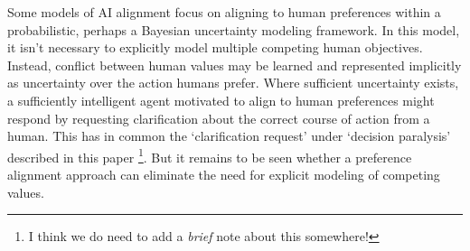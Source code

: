 Some models of AI alignment focus on \cite{russell2019human} aligning to human preferences within a probabilistic, perhaps a Bayesian uncertainty modeling framework.  In this model, it isn't necessary to explicitly model multiple competing human objectives. Instead, conflict between human values may be learned and represented implicitly as uncertainty over the action humans prefer. Where sufficient uncertainty exists, a sufficiently intelligent agent motivated to align to human preferences might respond by requesting clarification about the correct course of action from a human. This has in common the `clarification request' under `decision paralysis' described in this paper \footnote{I think we do need to add a \textit{brief} note about this somewhere!}. But it remains to be seen whether a preference alignment approach can eliminate the need for explicit modeling of competing values.